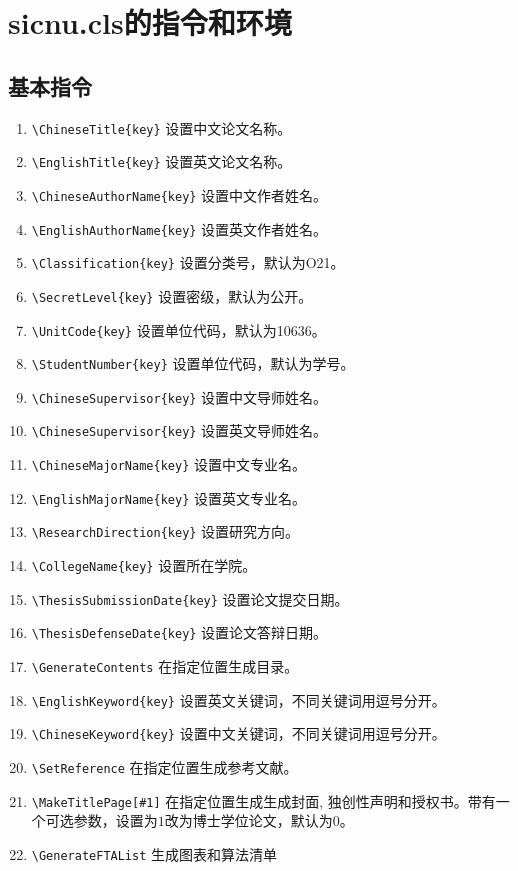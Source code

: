 \section{sicnu.cls的指令和环境}\label{sec:cml}
\subsection{基本指令}
\begin{tcolorbox}[colback=gray!10,
    colframe=black,
    width=16cm,
    arc=1mm, auto outer arc,
    boxrule=0.5pt,]
    
    \begin{enumerate}
        \item \verb|\ChineseTitle{key}| 设置中文论文名称。
        \item \verb|\EnglishTitle{key}| 设置英文论文名称。
        \item \verb|\ChineseAuthorName{key}| 设置中文作者姓名。
        \item \verb|\EnglishAuthorName{key}| 设置英文作者姓名。
        \item \verb|\Classification{key}| 设置分类号，默认为O21。
        \item \verb|\SecretLevel{key}| 设置密级，默认为公开。
        \item \verb|\UnitCode{key}| 设置单位代码，默认为10636。
        \item \verb|\StudentNumber{key}| 设置单位代码，默认为学号。
        \item \verb|\ChineseSupervisor{key}| 设置中文导师姓名。
        \item \verb|\ChineseSupervisor{key}| 设置英文导师姓名。
        \item \verb|\ChineseMajorName{key}| 设置中文专业名。
        \item \verb|\EnglishMajorName{key}| 设置英文专业名。
        \item \verb|\ResearchDirection{key}| 设置研究方向。
        \item \verb|\CollegeName{key}| 设置所在学院。
        \item \verb|\ThesisSubmissionDate{key}| 设置论文提交日期。
        \item \verb|\ThesisDefenseDate{key}| 设置论文答辩日期。
        \item \verb|\GenerateContents| 在指定位置生成目录。
        \item \verb|\EnglishKeyword{key}| 设置英文关键词，不同关键词用逗号分开。
        \item \verb|\ChineseKeyword{key}| 设置中文关键词，不同关键词用逗号分开。
        \item \verb|\SetReference| 在指定位置生成参考文献。
        \item \verb|\MakeTitlePage[#1]| 在指定位置生成生成封面, 独创性声明和授权书。带有一个可选参数，设置为$1$改为博士学位论文，默认为$0$。
        \item \verb|\GenerateFTAList| 生成图表和算法清单
    \end{enumerate}

\end{tcolorbox}

